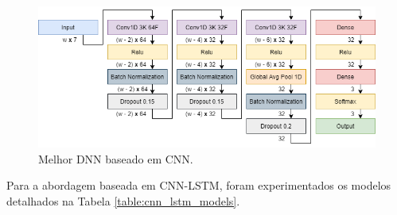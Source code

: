 \begin{figure}[h!]
  \centering
  \includegraphics[width=1\textwidth]{figuras/cnn_dnn.png}
  \caption{Melhor DNN baseado em CNN.}
  \label{fig:cnn_dnn}
\end{figure}

Para a abordagem baseada em CNN-LSTM, foram experimentados os modelos detalhados na Tabela \ref{table:cnn_lstm_models}.


